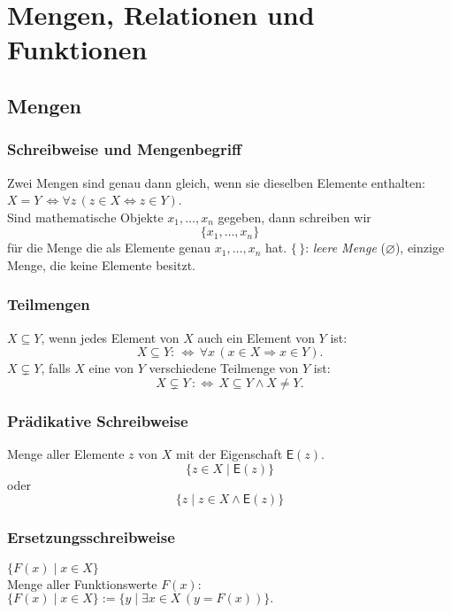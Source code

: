 \section{Mengen, Relationen und Funktionen}%
\label{sec:mengen_relationen_und_funktionen}
\subsection{Mengen}%
\label{sub:mengen}

\subsubsection{Schreibweise und Mengenbegriff}%
\label{ssub:schreibweise}
\begin{minipage}{0.9\linewidth}
	Zwei Mengen sind genau dann gleich, wenn sie dieselben Elemente enthalten:
	$X = Y\, \Leftrightarrow \forall z\, (z \in X \Leftrightarrow z \in Y)$. \\
	Sind mathematische Objekte $x_1,\dots,x_n$ gegeben, dann schreiben wir
	\[
		\{x_1,\dots,x_n\}
	\]
	für die Menge die als Elemente genau $x_1,\dots,x_n$ hat.
	$\{\,\}$: \textit{leere Menge} ($\varnothing$), einzige Menge, die keine Elemente besitzt.
\end{minipage}

\subsubsection{Teilmengen}%
\label{ssub:teilm}
\begin{minipage}{0.9\linewidth}
	$X\subseteq Y$, wenn jedes Element von $X$ auch ein Element von $Y$ ist:
	\[
		X\subseteq Y:\,\Leftrightarrow\,\forall x\,(x\in X\Rightarrow x\in Y).
	\]
	$X\subsetneq Y$, falls $X$ eine von $Y$ verschiedene Teilmenge von $Y$ ist:
	\[
		X\subsetneq Y\,:\Leftrightarrow\, X\subseteq Y\land X\neq Y.
	\]
\end{minipage}

\subsubsection{Prädikative Schreibweise}%
\label{ssub:mengeneigenschaft}
\begin{minipage}{0.9\linewidth}
	Menge aller Elemente $z$ von $X$ mit der Eigenschaft $\mathsf{E}(z)$.
	\[
		\big\{z\in X\mid \mathsf{E}(z)\big\}
	\]
	oder
	\[
		\big\{z\mid z\in X\land\mathsf{E}(z)\big\}
	\]
\end{minipage}

\subsubsection{Ersetzungsschreibweise}%
\label{ssub:ersetzungsschreibweise}
\begin{minipage}{0.9\linewidth}
	$\big\{F(x)\mid x\in X \big\}$ \\
	Menge aller Funktionswerte $F(x)$: \\
	$\big\{F(x)\mid x\in X\big\}:=\{y\mid \exists x\in X\,(y=F(x))\}.$
\end{minipage}

